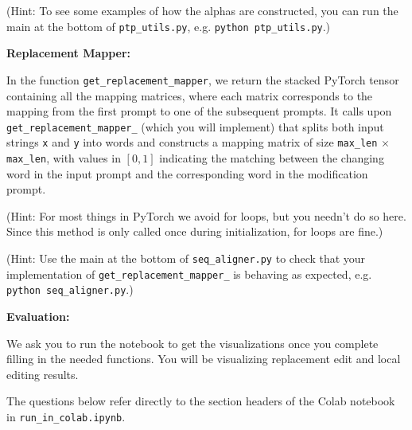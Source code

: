 \documentclass[11pt,addpoints,answers]{exam}
\begin{document}
\begin{questions}
\begin{itemize}
(Hint: To see some examples of how the alphas are constructed, you can run the main at the bottom of \lstinline{ptp_utils.py}, e.g. \lstinline{python ptp_utils.py}.)

\end{itemize}


\textbf{Replacement Mapper:}

In the function \lstinline{get_replacement_mapper}, we return the stacked PyTorch tensor containing all the mapping matrices, where each matrix corresponds to the mapping from the first prompt to one of the subsequent prompts. It calls upon \lstinline{get_replacement_mapper_} (which you will implement) that splits both input strings \lstinline{x} and \lstinline{y} into words and constructs a mapping matrix of size \lstinline{max_len} $\times$ \lstinline{max_len}, with values in $[0,1]$ indicating the matching between the changing word in the input prompt and the corresponding word in the modification prompt.

(Hint: For most things in PyTorch we avoid for loops, but you needn't do so here. Since this method is only called once during initialization, for loops are fine.)

(Hint: Use the main at the bottom of \lstinline{seq_aligner.py} to check that your implementation of \lstinline{get_replacement_mapper_} is behaving as expected, e.g. \lstinline{python seq_aligner.py}.)

\textbf{Evaluation:} 

We ask you to run the notebook to get the visualizations once you complete filling in the needed functions. You will be visualizing replacement edit and local editing results.

\clearpage


The questions below refer directly to the section headers of the Colab notebook in \lstinline{run_in_colab.ipynb}.

\end{questions}
\end{document}
